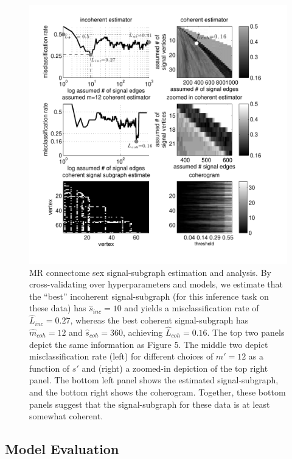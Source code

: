 \documentclass[10pt,journal,cspaper,compsoc]{IEEEtran}
\providecommand{\wh}[1]{\widehat{#1}}
\begin{document}
\begin{figure}[htbp]
	\centering
		\includegraphics[width=1.0\linewidth]{BLSA0317_Count_Lhats_results.pdf}
	\caption{MR connectome sex signal-subgraph estimation and analysis. By cross-validating over hyperparameters and models, we estimate that the ``best'' incoherent signal-subgraph (for this inference task on these data) has $\wh{s}_{inc}=10$ and yields a misclassification rate of $\wh{L}_{inc}=0.27$, whereas the best coherent signal-subgraph has $\wh{m}_{coh}=12$ and $\wh{s}_{coh}=360$, achieving $\wh{L}_{coh}=0.16$.  The top two panels depict the same information as Figure 5.  The middle two depict misclassification rate (left) for different choices of $m'=12$ as a function of $s'$ and (right) a zoomed-in depiction of the top right panel. The bottom left panel shows the estimated signal-subgraph, and the bottom right shows the coherogram.  Together, these bottom panels suggest that the signal-subgraph for these data is at least somewhat coherent.}
	\label{fig:data}
\end{figure}




\subsection{Model Evaluation} %
\label{sub:model_checking}
\end{document}
